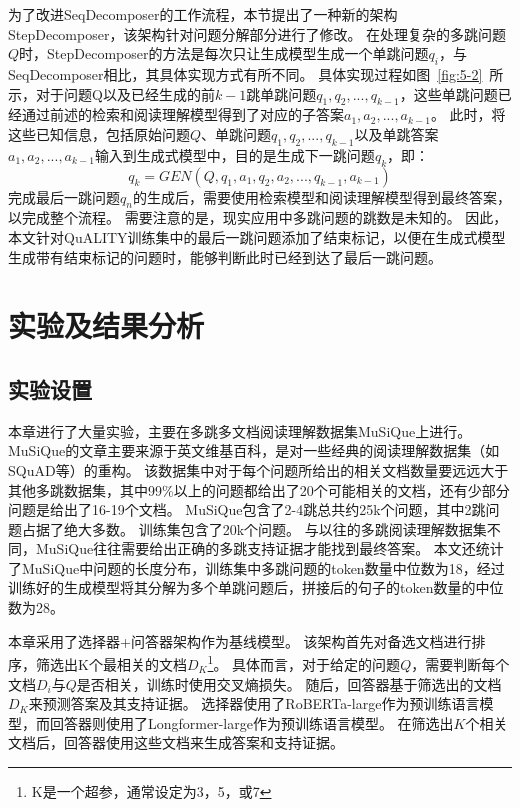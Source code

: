 为了改进SeqDecomposer的工作流程，本节提出了一种新的架构StepDecomposer，该架构针对问题分解部分进行了修改。
在处理复杂的多跳问题$Q$时，StepDecomposer的方法是每次只让生成模型生成一个单跳问题$q_i$，与SeqDecomposer相比，其具体实现方式有所不同。
具体实现过程如图~\ref{fig:5-2}~所示，对于问题Q以及已经生成的前$k-1$跳单跳问题$q_1, q_2, ..., q_{k-1}$，这些单跳问题已经通过前述的检索和阅读理解模型得到了对应的子答案$a_1, a_2, ..., a_{k-1}$。
此时，将这些已知信息，包括原始问题$Q$、单跳问题$q_1, q_2, ..., q_{k-1}$以及单跳答案$a_1, a_2, ..., a_{k-1}$输入到生成式模型中，目的是生成下一跳问题$q_k$，即：
\begin{equation}
    q_k = GEN(Q,q_1,a_1,q_2,a_2,...,q_{k-1},a_{k-1})
\end{equation}
完成最后一跳问题$q_n$的生成后，需要使用检索模型和阅读理解模型得到最终答案，以完成整个流程。
需要注意的是，现实应用中多跳问题的跳数是未知的。
因此，本文针对QuALITY训练集中的最后一跳问题添加了结束标记，以便在生成式模型生成带有结束标记的问题时，能够判断此时已经到达了最后一跳问题。




\section{实验及结果分析}

\subsection{实验设置}
本章进行了大量实验，主要在多跳多文档阅读理解数据集MuSiQue上进行。
MuSiQue的文章主要来源于英文维基百科，是对一些经典的阅读理解数据集（如SQuAD等）的重构。
该数据集中对于每个问题所给出的相关文档数量要远远大于其他多跳数据集，其中99\%以上的问题都给出了20个可能相关的文档，还有少部分问题是给出了16-19个文档。
MuSiQue包含了2-4跳总共约25k个问题，其中2跳问题占据了绝大多数。
训练集包含了20k个问题。
与以往的多跳阅读理解数据集不同，MuSiQue往往需要给出正确的多跳支持证据才能找到最终答案。
本文还统计了MuSiQue中问题的长度分布，训练集中多跳问题的token数量中位数为18，经过训练好的生成模型将其分解为多个单跳问题后，拼接后的句子的token数量的中位数为28。

本章采用了选择器+问答器架构作为基线模型。
该架构首先对备选文档进行排序，筛选出K个最相关的文档$D_K$\footnote{K是一个超参，通常设定为3，5，或7}。
具体而言，对于给定的问题$Q$，需要判断每个文档$D_i$与$Q$是否相关，训练时使用交叉熵损失。
随后，回答器基于筛选出的文档$D_K$来预测答案及其支持证据。
选择器使用了RoBERTa-large作为预训练语言模型，而回答器则使用了Longformer-large作为预训练语言模型。
在筛选出$K$个相关文档后，回答器使用这些文档来生成答案和支持证据。

